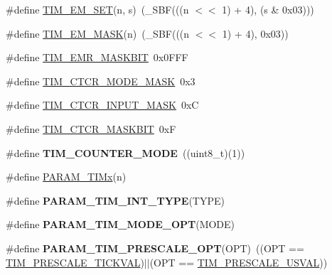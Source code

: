 \begin{DoxyCompactItemize}
\item 
\#define \hyperlink{group___t_i_m___private___macros_ga5c3ec5dfc08e6193282be74ff3e71ac8}{\-T\-I\-M\-\_\-\-E\-M\-\_\-\-S\-E\-T}(n, s)~(\-\_\-\-S\-B\-F(((n $<$$<$ 1) + 4), (s \& 0x03)))
\item 
\#define \hyperlink{group___t_i_m___private___macros_ga880fd035ad17447bea157581233a4e69}{\-T\-I\-M\-\_\-\-E\-M\-\_\-\-M\-A\-S\-K}(n)~(\-\_\-\-S\-B\-F(((n $<$$<$ 1) + 4), 0x03))
\item 
\#define \hyperlink{group___t_i_m___private___macros_ga0ae19710157af886d70e51ef61c394f7}{\-T\-I\-M\-\_\-\-E\-M\-R\-\_\-\-M\-A\-S\-K\-B\-I\-T}~0x0\-F\-F\-F
\item 
\#define \hyperlink{group___t_i_m___private___macros_ga1f20d67aab117d4d9f70dd76fc20a3b7}{\-T\-I\-M\-\_\-\-C\-T\-C\-R\-\_\-\-M\-O\-D\-E\-\_\-\-M\-A\-S\-K}~0x3
\item 
\#define \hyperlink{group___t_i_m___private___macros_gac51fa37133517f785c6454df06534506}{\-T\-I\-M\-\_\-\-C\-T\-C\-R\-\_\-\-I\-N\-P\-U\-T\-\_\-\-M\-A\-S\-K}~0x\-C
\item 
\#define \hyperlink{group___t_i_m___private___macros_ga0500218b29fa2236a3a9f89ff85d4905}{\-T\-I\-M\-\_\-\-C\-T\-C\-R\-\_\-\-M\-A\-S\-K\-B\-I\-T}~0x\-F
\item 
\hypertarget{group___t_i_m___private___macros_ga32b82e379bae4986c99baad96e4d890a}{\#define {\bfseries \-T\-I\-M\-\_\-\-C\-O\-U\-N\-T\-E\-R\-\_\-\-M\-O\-D\-E}~((uint8\-\_\-t)(1))}\label{group___t_i_m___private___macros_ga32b82e379bae4986c99baad96e4d890a}

\item 
\#define \hyperlink{group___t_i_m___private___macros_ga926b90bdcd3637995abb96f9d39e0145}{\-P\-A\-R\-A\-M\-\_\-\-T\-I\-Mx}(n)
\item 
\#define {\bfseries \-P\-A\-R\-A\-M\-\_\-\-T\-I\-M\-\_\-\-I\-N\-T\-\_\-\-T\-Y\-P\-E}(\-T\-Y\-P\-E)
\item 
\#define {\bfseries \-P\-A\-R\-A\-M\-\_\-\-T\-I\-M\-\_\-\-M\-O\-D\-E\-\_\-\-O\-P\-T}(\-M\-O\-D\-E)
\item 
\hypertarget{group___t_i_m___private___macros_ga416ef5dfb995b9ba849f22e5907f64df}{\#define {\bfseries \-P\-A\-R\-A\-M\-\_\-\-T\-I\-M\-\_\-\-P\-R\-E\-S\-C\-A\-L\-E\-\_\-\-O\-P\-T}(\-O\-P\-T)~((\-O\-P\-T == \hyperlink{group___t_i_m___public___types_ggac736309e96b25f5f63cdb5418131dc18a3805cb9cacbd1617b64afcce27d31b0f}{\-T\-I\-M\-\_\-\-P\-R\-E\-S\-C\-A\-L\-E\-\_\-\-T\-I\-C\-K\-V\-A\-L})$|$$|$(\-O\-P\-T == \hyperlink{group___t_i_m___public___types_ggac736309e96b25f5f63cdb5418131dc18ab55346341a62e2f5bc5f2be410e7ab5c}{\-T\-I\-M\-\_\-\-P\-R\-E\-S\-C\-A\-L\-E\-\_\-\-U\-S\-V\-A\-L}))}\label{group___t_i_m___private___macros_ga416ef5dfb995b9ba849f22e5907f64df}


\end{DoxyCompactItemize}
